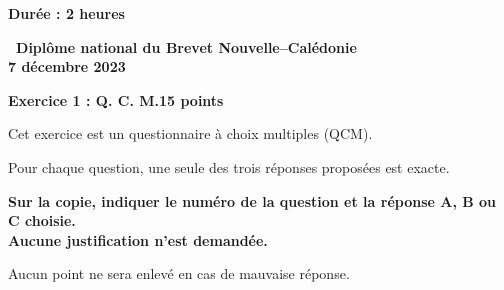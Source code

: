 \documentclass[11pt]{article}
\begin{document}
\label{Caledoniedec}

\pagestyle{fancy}
\thispagestyle{empty}

\begin{center}\textbf{Durée : 2 heures}

\vspace{0,5cm}

{\Large\textbf{\decofourleft~Diplôme national du Brevet
Nouvelle--Calédonie~\decofourright}}\\[7pt]
{\Large \textbf{7 décembre 2023}}
\end{center}

\vspace{0,5cm}

\textbf{Exercice 1 : Q. C. M.\hfill 15 points}

\medskip

Cet exercice est un questionnaire à choix multiples (QCM).

Pour chaque question, une seule des trois réponses proposées est exacte.

\textbf{Sur la copie, indiquer le numéro de la question et la réponse A, B ou C choisie.\\
Aucune justification n'est demandée.}

Aucun point ne sera enlevé en cas de mauvaise réponse.
\end{document}
